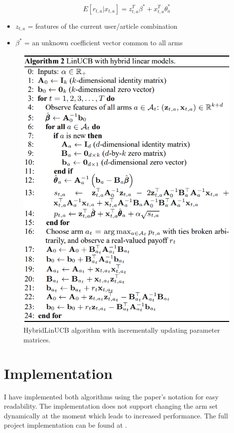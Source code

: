 \documentclass[12pt, titlepage]{article}
\begin{document}
$$
E[r_{t,a}|x_{t,a}] = z^T_{t,a}\beta^* + x^T_{t,a}\theta^*_a 
$$

\begin{itemize}
\item $z_{t,a}$ = features of the current user/article combination
\item $\beta^*$ = an unknown coefficient vector common to all arms
\end{itemize}

\begin{figure}[h!]
 \centering
 \includegraphics[scale=0.9]{img/HybridLinUCB_alg}
 \caption{HybridLinUCB algorithm with incrementally updating parameter matrices.\cite{cit:paper}}
 \label{fig:HybridlinUCB_alg}
\end{figure}


\section{Implementation}\label{sec:impl}
I have implemented both algorithms using the paper's notation for easy readability. The implementation does not support changing the arm set dynamically at the moment which leads to increased performance. The full project implementation can be found at \cite{cit:impl}.
\end{document}
